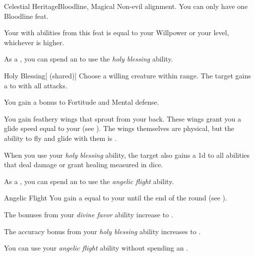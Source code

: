     \begin{feat}{Celestial Heritage}{Bloodline, Magical}
        \featpre Non-evil alignment.
         You can only have one Bloodline feat.

         Your  with abilities from this feat is equal to your Willpower or your level, whichever is higher.

         As a , you can spend an  to use the \textit{holy blessing} ability.
        \begin{ability}{Holy Blessing}[ (shared)]
            Choose a willing creature within \rngclose range.
            The target gains a   to  with all attacks.
        \end{ability}

         You gain a  bonus to Fortitude and Mental defense.

         You gain feathery wings that sprout from your back.
        These wings grant you a glide speed equal to your  (see ).
        The wings themselves are physical, but the ability to fly and glide with them is .

         When you use your \textit{holy blessing} ability, the target also gains a \plus1d  to all abilities that deal damage or grant healing measured in dice.

         As a , you can spend an  to use the \textit{angelic flight} ability.
        \begin{ability}{Angelic Flight}
            You gain a  equal to your  until the end of the round (see ).
        \end{ability}

         The bonuses from your \textit{divine favor} ability increase to .

         The accuracy bonus from your \textit{holy blessing} ability increases to .

         You can use your \textit{angelic flight} ability without spending an .
    \end{feat}

